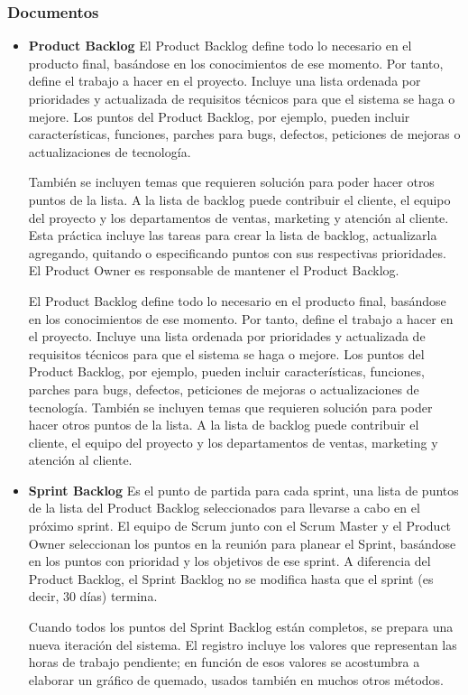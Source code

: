 \subsubsection{Documentos}
\begin{itemize}
\item \textbf{Product Backlog} El Product Backlog define todo lo necesario en el producto final, basándose en los conocimientos de ese momento. Por tanto, define el trabajo a hacer en el proyecto. Incluye una lista ordenada por prioridades y actualizada de requisitos técnicos para que el sistema se haga o mejore. Los puntos del Product Backlog, por ejemplo, pueden incluir características, funciones, parches para bugs, defectos, peticiones de mejoras o actualizaciones de tecnología.
 
También se incluyen temas que requieren solución para poder hacer otros puntos de la lista. A la lista de backlog puede contribuir el cliente, el equipo del proyecto y los departamentos de ventas, marketing y atención al cliente.
Esta práctica incluye las tareas para crear la lista de backlog, actualizarla agregando, quitando o especificando puntos con sus respectivas prioridades. El Product Owner es responsable de mantener el Product Backlog.

El Product Backlog define todo lo necesario en el producto final, basándose en los conocimientos de ese momento. Por tanto, define el trabajo a hacer en el proyecto. Incluye una lista ordenada por prioridades y actualizada de requisitos técnicos para que el sistema se haga o mejore. Los puntos del Product Backlog, por ejemplo, pueden incluir características, funciones, parches para bugs, defectos, peticiones de mejoras o actualizaciones de tecnología.
También se incluyen temas que requieren solución para poder hacer otros puntos de la lista. A la lista de backlog puede contribuir el cliente, el equipo del proyecto y los departamentos de ventas, marketing y atención al cliente.

\item \textbf{Sprint Backlog} Es el punto de partida para cada sprint, una lista de puntos de la lista del Product Backlog seleccionados para llevarse a cabo en el próximo sprint. El equipo de Scrum junto con el Scrum Master y el Product Owner seleccionan los puntos en la reunión para planear el Sprint, basándose en los puntos con prioridad y los objetivos de ese sprint. A diferencia del Product Backlog, el Sprint Backlog no se modifica hasta que el sprint (es decir, 30 días) termina.
 
Cuando todos los puntos del Sprint Backlog están completos, se prepara una nueva iteración del sistema. El registro incluye los valores que representan las horas de trabajo pendiente; en función de esos valores se acostumbra a elaborar un gráfico de quemado, usados también en muchos otros métodos.
\end{itemize}
